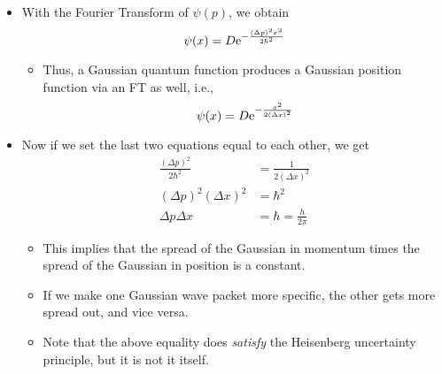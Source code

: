 \documentclass[../notes.tex]{subfiles}
\begin{document}
\begin{itemize}
\begin{itemize}
    \end{itemize}
    \item With the Fourier Transform of $\psi(p)$, we obtain
    \begin{equation*}
        \psi(x) = D\e[-\frac{(\Delta p)^2x^2}{2\hbar^2}]
    \end{equation*}
    \begin{itemize}
        \item Thus, a Gaussian quantum function produces a Gaussian position function via an FT as well, i.e.,
        \begin{equation*}
            \psi(x) = D\e[-\frac{x^2}{2(\Delta x)^2}]
        \end{equation*}
    \end{itemize}
    \item Now if we set the last two equations equal to each other, we get
    \begin{align*}
        \frac{(\Delta p)^2}{2\hbar^2} &= \frac{1}{2(\Delta x)^2}\\
        (\Delta p)^2(\Delta x)^2 &= \hbar^2\\
        \Delta p\Delta x &= \hbar = \frac{h}{2\pi}
    \end{align*}
    \begin{itemize}
        \item This implies that the spread of the Gaussian in momentum times the spread of the Gaussian in position is a constant.
        \item If we make one Gaussian wave packet more specific, the other gets more spread out, and vice versa.
        \item Note that the above equality does \emph{satisfy} the Heisenberg uncertainty principle, but it is not it itself.
    \end{itemize}
\end{itemize}
\end{document}
